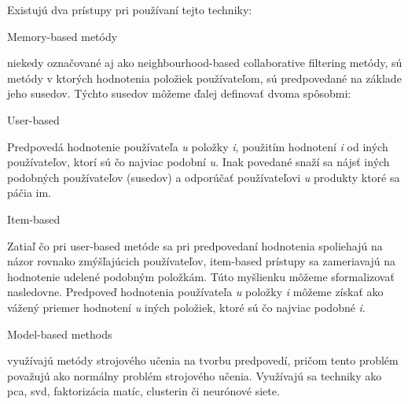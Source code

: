 Existujú dva prístupy pri používaní tejto techniky:
\begin{enumerate}
	{\bf \item Memory-based metódy} niekedy označované aj ako neighbourhood-based collaborative filtering metódy, sú metódy v ktorých hodnotenia položiek používateľom, sú predpovedané na základe jeho susedov. Týchto susedov môžeme ďalej definovať dvoma spôsobmi:
\begin{itemize}[leftmargin=*]
	{\bf \item User-based}\newline	
Predpovedá hodnotenie používateľa \textit{u} položky \textit{i}, použitím hodnotení \textit{i} od iných používateľov, ktorí sú čo najviac podobní \textit{u}. Inak povedané snaží sa nájsť iných podobných používateľov (susedov) a odporúčať používateľovi \textit{u} produkty ktoré sa páčia im.
	{\bf \item Item-based} \newline
Zatiaľ čo pri user-based metóde sa pri predpovedaní hodnotenia spoliehajú na názor rovnako zmýšľajúcich používateľov, item-based prístupy sa zameriavajú na hodnotenie udelené podobným položkám. Túto myšlienku môžeme sformalizovať nasledovne. Predpoveď hodnotenia používateľa \textit{u} položky \textit{i} môžeme získať ako vážený priemer hodnotení \textit{u} iných položiek, ktoré sú čo najviac podobné \textit{i}.
\end{itemize}
	{\bf \item Model-based methods} využívajú metódy strojového učenia na tvorbu predpovedí, pričom tento problém považujú ako normálny problém strojového učenia. Využívajú sa techniky ako \acrshort{pca}, \acrshort{svd}, faktorizácia matíc, clusterin či neurónové siete. \\
\end{enumerate}


